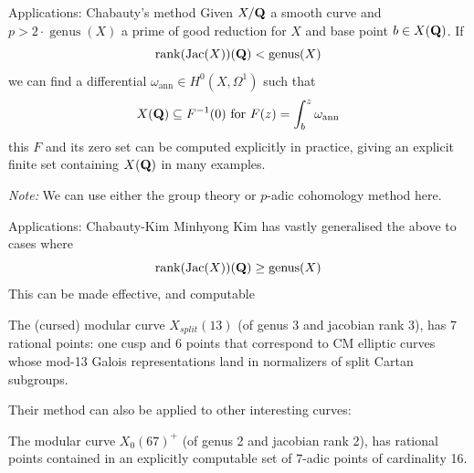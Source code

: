 \begin{frame}{Applications: Chabauty's method}
    Given $X/\mathbf Q$ a smooth curve and $p> 2\cdot\operatorname{genus}(X)$ a prime of good reduction for $X$ and base point $b \in X(\mathbf Q)$.
    If
    \[ \operatorname{rank}(\operatorname{Jac}(X))(\mathbf Q) < \operatorname{genus}(X) \]
    we can find a differential $\omega _{\text{ann}}\in H^0(X, \Omega ^1)$ such that
    \[
        X(\mathbf Q) \subseteq F^{-1}(0) \text{ for } F(z) = \int_b^z \omega_{\text{ann}}
    \]\pause
    this $F$ and its zero set can be computed explicitly in practice, giving an explicit finite set containing $X(\mathbf Q)$ in many examples.\pause

    \emph{Note:} We can use either the group theory or $p$-adic cohomology method here.

\end{frame}

\begin{frame}{Applications: Chabauty-Kim}
    Minhyong Kim has vastly generalised the above to cases where
    \[ \operatorname{rank}(\operatorname{Jac}(X))(\mathbf Q) \ge \operatorname{genus}(X)\]\pause
    This can be made effective, and computable
    \begin{theorem}
        The (cursed) modular curve \(X_{split}(13)\) (of genus 3 and jacobian rank 3),
        has 7 rational points: one cusp and 6 points that correspond to CM elliptic curves whose mod-13 Galois representations land in normalizers of split Cartan subgroups.
    \end{theorem}\pause

    Their method can also be applied to other interesting curves:

    \begin{theorem}
        The modular curve \(X_{0}(67)^+\) (of genus 2 and jacobian rank 2),
        has rational points contained in an explicitly computable set of $7$-adic points of cardinality 16.
    \end{theorem}
\end{frame}



